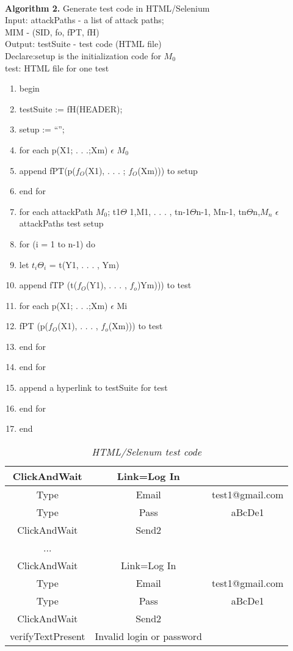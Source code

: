 \paragraph{} \textbf{Algorithm 2.} Generate test code in HTML/Selenium
\\Input: attackPaths - a list of attack paths;
\\MIM - (SID, fo, fPT, fH)
\\Output: testSuite - test code (HTML file)
\\Declare:setup is the initialization code for $M_0$
\\test: HTML file for one test
\begin{enumerate}
\item begin
\item testSuite := fH(HEADER);
\item setup := “”;
\item for each p(X1; . . .;Xm) $\epsilon$ $M_0$
\item append fPT(p($f_O$(X1), . . . ; $f_O$(Xm))) to setup
\item end for
\item for each attackPath $M_0$; t1$\Theta$ 1,M1, . . . , tn-1$\Theta$n-1, Mn-1, tn$\Theta$n,$M_n$ $\epsilon$ attackPaths
test setup
\item for (i = 1 to n-1) do
\item let $t_i\Theta_i$ = t(Y1, . . . , Ym)
\item append fTP (t($f_O$(Y1), . . . , $f_o$)Ym))) to test
\item for each p(X1; . . .;Xm) $\epsilon$ Mi
\item fPT (p($f_O$(X1), . . . , $f_o$(Xm))) to test
\item end for
\item end for
\item append a hyperlink to testSuite for test
\item end for
\item end
\end{enumerate}
\begin{table}
\centering
\label{Table:2}
\begin{tabular}{|c|c|c|}
\hline
ClickAndWait & Link=Log In & 
\\
\hline
Type & Email & test1@gmail.com 
\\
\hline
Type & Pass & aBcDe1 
\\
\hline
ClickAndWait & Send2 & 
\\
\hline
... &  &
\\
\hline
ClickAndWait & Link=Log In & 
\\
\hline
Type & Email & test1@gmail.com 
\\
\hline
Type & Pass & aBcDe1 
\\
\hline
ClickAndWait & Send2 & 
\\
\hline
verifyTextPresent & Invalid login or password & 
\\
\hline

\end{tabular}
\caption{\textit{HTML/Selenum test code}}
\end{table}
